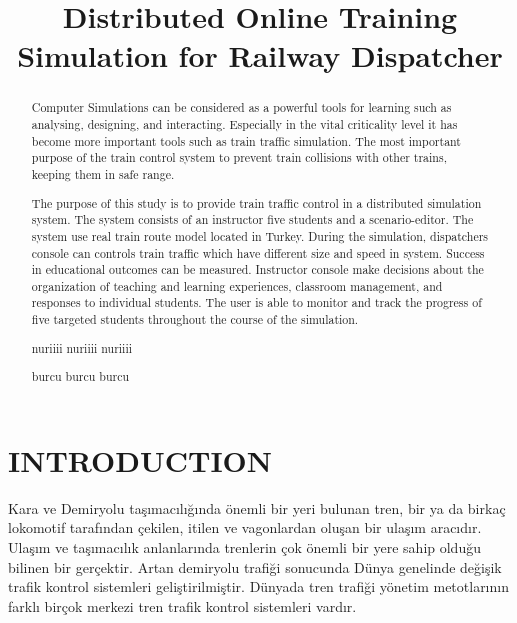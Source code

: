 \documentclass[conference]{IEEEtran}
\begin{document}
\title{Distributed Online Training Simulation for Railway Dispatcher }



\author{


}

\maketitle

\begin{abstract}
Computer Simulations can be considered as a powerful tools for learning such as analysing, designing, and interacting. Especially in the vital criticality level it has become more important tools such as train traffic simulation.
The most important purpose of the train control system to prevent train collisions with other trains, keeping them in safe range.

The purpose of this study is to provide train traffic control in a distributed simulation system. The system consists of an instructor five students and a scenario-editor. The system use real train route model located in Turkey.  During the simulation, dispatchers console can controls train traffic which have different  size and speed in system. Success in educational outcomes can be measured. Instructor console make decisions about the organization of teaching and learning 
experiences, classroom management, and responses to 
individual students. The user is able to monitor and track the progress of five targeted students throughout the course of the simulation.

nuriiii nuriiii nuriiii

burcu burcu burcu
\end{abstract}

\section{INTRODUCTION}
Kara ve Demiryolu taşımacılığında önemli bir yeri bulunan tren, bir ya da birkaç lokomotif tarafından çekilen, itilen ve vagonlardan oluşan bir ulaşım aracıdır. Ulaşım ve taşımacılık anlanlarında trenlerin çok önemli bir yere sahip olduğu bilinen bir gerçektir. 
Artan demiryolu trafiği sonucunda Dünya genelinde değişik trafik kontrol sistemleri geliştirilmiştir. Dünyada tren trafiği yönetim metotlarının farklı birçok merkezi tren trafik kontrol sistemleri vardır.
\end{document}
